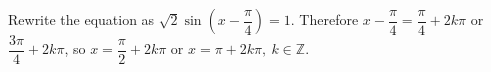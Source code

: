 Rewrite the equation as $\sqrt{2} \sin (x - \dfrac{\pi}{4}) = 1$. Therefore $x - \dfrac{\pi}{4} = \dfrac{\pi}{4} + 2 k \pi$ or $\dfrac{3 \pi}{4} + 2 k \pi$, so $\boxed{x = \dfrac{\pi}{2} + 2 k \pi \text{ or } x = \pi + 2 k \pi , \  k \in \mathbb{Z}}$.
